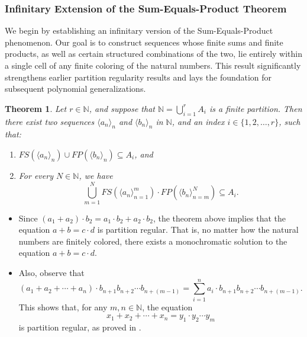 \documentclass{article}
\theoremstyle{Theorem}
\newtheorem{thm}{Theorem}[section]
\theoremstyle{definition}
\begin{document}
\subsubsection{Infinitary Extension of the Sum-Equals-Product Theorem}

We begin by establishing an infinitary version of the Sum-Equals-Product phenomenon. Our goal is to construct sequences whose finite sums and finite products, as well as certain structured combinations of the two, lie entirely within a single cell of any finite coloring of the natural numbers. This result significantly strengthens earlier partition regularity results and lays the foundation for subsequent polynomial generalizations.



\begin{thm}\label{task2}
    Let \( r \in \mathbb{N} \), and suppose that \( \mathbb{N} = \bigcup_{i=1}^r A_i \) is a finite partition. Then there exist two sequences \( \langle a_n \rangle_n \) and \( \langle b_n \rangle_n \) in \( \mathbb{N} \), and an index \( i \in \{1,2,\ldots, r\} \), such that:
    \begin{enumerate}
        \item \( FS\left(\langle a_n \rangle_n\right) \cup FP\left(\langle b_n \rangle_n\right) \subseteq A_i \), and 
        \item For every \( N \in \mathbb{N} \), we have
        \[
        \bigcup_{m=1}^N FS\left(\langle a_n \rangle_{n=1}^m\right) \cdot FP\left(\langle b_n \rangle_{n=m}^N\right) \subseteq A_i.
        \]
    \end{enumerate}
\end{thm}


\begin{itemize}
    \item Since \( (a_1 + a_2) \cdot b_2 = a_1 \cdot b_2 + a_2 \cdot b_2 \), the theorem above implies that the equation \( a + b = c \cdot d \) is partition regular. That is, no matter how the natural numbers are finitely colored, there exists a monochromatic solution to the equation \( a + b = c \cdot d \).
    
    \item Also, observe that
    \[
    (a_1 + a_2 + \cdots + a_n) \cdot b_{n+1} b_{n+2} \cdots b_{n+(m-1)} = \sum_{i=1}^n a_i \cdot b_{n+1} b_{n+2} \cdots b_{n+(m-1)}.
    \]
    This shows that, for any \( m,n \in \mathbb{N} \), the equation
    \[
    x_1 + x_2 + \cdots + x_n = y_1 \cdot y_2 \cdots y_m
    \]
    is partition regular, as proved in \cite{h2}.
\end{itemize}
\end{document}
